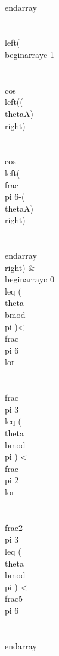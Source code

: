 \\end{array} \\\\
 \\left(
\\begin{array}{c}
 1 \\\\
 \\cos \\left((\\thetaA)\\right) \\\\
 \\cos \\left(\\frac{\\pi }{6}-(\\thetaA)\\right) \\\\
\\end{array}
\\right)  & 
\\begin{array}{c}
0\\leq (\\theta  \\bmod \\pi )<\\frac{\\pi }{6}\\lor \\\\
\\frac{\\pi }{3}\\leq (\\theta  \\bmod \\pi ) < \\frac{\\pi }{2}\\lor \\\\
\\frac{2 \\pi }{3}\\leq (\\theta \\bmod \\pi ) <\\frac{5 \\pi }{6} \\\\
\\end{array}

